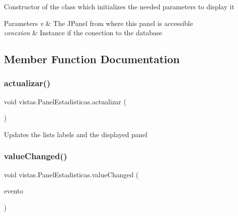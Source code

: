 Constructor of the class which initializes the needed parameters to display it 
\begin{DoxyParams}{Parameters}
{\em v} & The J\+Panel from where this panel is accessible \\
\hline
{\em conexion} & Instance if the conection to the database \\
\hline
\end{DoxyParams}


\subsection{Member Function Documentation}
\mbox{\label{classvistas_1_1_panel_estadisticas_a3daac089d3c88691869b45d9c0961b30}} 
\subsubsection{\texorpdfstring{actualizar()}{actualizar()}}
{\footnotesize\ttfamily void vistas.\+Panel\+Estadisticas.\+actualizar (\begin{DoxyParamCaption}{ }\end{DoxyParamCaption})\hspace{0.3cm}{\ttfamily [inline]}}

Updates the list\textquotesingle{}s labels and the displayed panel \mbox{\label{classvistas_1_1_panel_estadisticas_ad053d06b278eae5f7f54af0476ca0461}} 
\subsubsection{\texorpdfstring{value\+Changed()}{valueChanged()}}
{\footnotesize\ttfamily void vistas.\+Panel\+Estadisticas.\+value\+Changed (\begin{DoxyParamCaption}\item[{List\+Selection\+Event}]{evento }\end{DoxyParamCaption})\hspace{0.3cm}{\ttfamily [inline]}}

